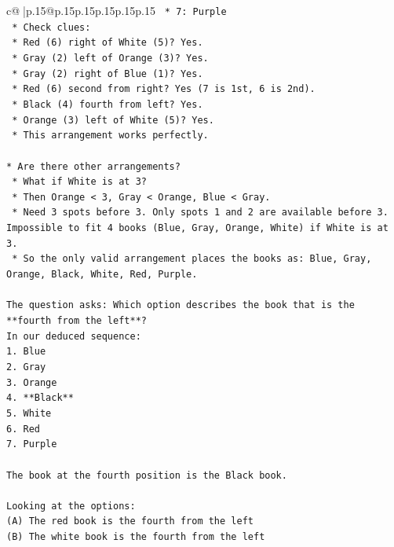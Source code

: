 \documentclass{article}
\begin{document}
{\begin{supertabular}{c@{$\;$}|p{.15\linewidth}@{}p{.15\linewidth}p{.15\linewidth}p{.15\linewidth}p{.15\linewidth}p{.15\linewidth}}
{{{\texttt{        *   7: Purple} \\
\texttt{    *   Check clues:} \\
\texttt{        *   Red (6) right of White (5)? Yes.} \\
\texttt{        *   Gray (2) left of Orange (3)? Yes.} \\
\texttt{        *   Gray (2) right of Blue (1)? Yes.} \\
\texttt{        *   Red (6) second from right? Yes (7 is 1st, 6 is 2nd).} \\
\texttt{        *   Black (4) fourth from left? Yes.} \\
\texttt{        *   Orange (3) left of White (5)? Yes.} \\
\texttt{    *   This arrangement works perfectly.} \\
\\ 
\texttt{*   Are there other arrangements?} \\
\texttt{    *   What if White is at 3?} \\
\texttt{        *   Then Orange < 3, Gray < Orange, Blue < Gray.} \\
\texttt{        *   Need 3 spots before 3. Only spots 1 and 2 are available before 3. Impossible to fit 4 books (Blue, Gray, Orange, White) if White is at 3.} \\
\texttt{    *   So the only valid arrangement places the books as: Blue, Gray, Orange, Black, White, Red, Purple.} \\
\\ 
\texttt{The question asks: Which option describes the book that is the **fourth from the left**?} \\
\texttt{In our deduced sequence:} \\
\texttt{1. Blue} \\
\texttt{2. Gray} \\
\texttt{3. Orange} \\
\texttt{4. **Black**} \\
\texttt{5. White} \\
\texttt{6. Red} \\
\texttt{7. Purple} \\
\\ 
\texttt{The book at the fourth position is the Black book.} \\
\\ 
\texttt{Looking at the options:} \\
\texttt{(A) The red book is the fourth from the left} \\
\texttt{(B) The white book is the fourth from the left} \\
}}}
\end{supertabular}}
\end{document}

